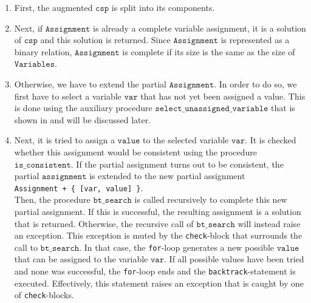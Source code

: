 \begin{enumerate}
\item First, the augmented $\mathtt{csp}$ is split into its components.
\item Next, if $\mathtt{Assignment}$ is already a complete variable assignment, it is a solution of
      $\mathtt{csp}$ and this solution is returned.  Since $\mathtt{Assignment}$ is represented as a binary
      relation, $\mathtt{Assignment}$ is complete if its size is the same as the size of $\mathtt{Variables}$.
\item Otherwise, we have to extend the partial $\mathtt{Assignment}$.  In order to do so, we first have to
      select a variable $\mathtt{var}$ that has not yet been assigned a value.  This is done using the
      auxiliary procedure $\mathtt{select\_unassigned\_variable}$ that is shown in
       and will be discussed later.
\item Next, it is tried to assign a $\mathtt{value}$ to the selected variable $\mathtt{var}$.  It is checked
      whether this assignment would be consistent using the procedure $\mathtt{is\_consistent}$.
      If the partial assignment turns out to be consistent, the partial $\mathtt{assignment}$
      is extended to the new partial assignment
      \\[0.2cm]
      \hspace*{1.3cm}
      \texttt{Assignment + \{ [var, value] \}}.
      \\[0.2cm]
      Then, the procedure $\mathtt{bt\_search}$ is called recursively to complete this new partial assignment.
      If this is successful, the resulting assignment is a solution that is returned.  Otherwise,
      the recursive call of $\mathtt{bt\_search}$ will instead raise an exception.  This exception is muted 
      by the \texttt{check}-block that surrounds the call to $\mathtt{bt\_search}$.  In that case, the
      \texttt{for}-loop generates a new possible $\mathtt{value}$ that can be assigned to the variable
      $\mathtt{var}$.  If all possible values have been tried and none was successful, the \texttt{for}-loop
      ends and the \texttt{backtrack}-statement is executed.  Effectively, this statement raises an exception
      that is caught by one of \texttt{check}-blocks.
\end{enumerate}


